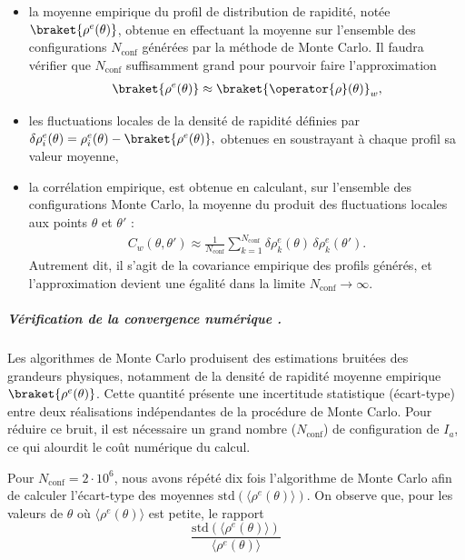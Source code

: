 \begin{itemize}[label = $\bullet$]
    \item la moyenne empirique du profil de distribution de rapidité, notée 
    \( \braket{\rho^e(\theta)}  \), obtenue en effectuant la moyenne sur l’ensemble des configurations \( N_{\text{conf}} \) générées par la méthode de Monte Carlo. Il faudra vérifier que \( N_{\text{conf}} \) suffisamment grand pour pourvoir faire l'approximation 
    \begin{eqnarray}\label{cahp4:eq.rho.e.1}
    	\braket{\rho^e(\theta)}  \approx \braket{\operator{\rho}(\theta)}_w,	
    \end{eqnarray}    
    \item les fluctuations locales de la densité de rapidité définies par 
    \(
    \delta\rho^e_i(\theta) = \rho^e_i(\theta) - \braket{\rho^e(\theta)},
    \)
    obtenues en soustrayant à chaque profil sa valeur moyenne,
    \item la corrélation empirique, est obtenue en calculant, sur l’ensemble des configurations Monte Carlo, la moyenne du produit des fluctuations locales aux points \(\theta\) et \(\theta'\) :
    \begin{eqnarray}\label{cahp4:eq.corre.e.1}
    	C_w(\theta, \theta') 
        \approx \frac{1}{N_{\text{conf}}} \sum_{k=1}^{N_{\text{conf}}} 
        \delta \rho^e_k(\theta) \, \delta \rho^e_k(\theta').	
    \end{eqnarray}
    Autrement dit, il s’agit de la covariance empirique des profils générés, et l’approximation devient une égalité dans la limite \( N_{\text{conf}} \to \infty \).
\end{itemize}

\medskip

\subparagraph{Vérification de la convergence numérique .}

Les algorithmes de Monte Carlo produisent des estimations bruitées des grandeurs physiques, notamment de la densité de rapidité moyenne empirique \( \braket{\rho^e(\theta)} \). Cette quantité présente une incertitude statistique (écart-type) entre deux réalisations indépendantes de la procédure de Monte Carlo. Pour réduire ce bruit, il est nécessaire un grand nombre ($N_{\text{conf}}$) de configuration de ${I_a}$, ce qui alourdit le coût numérique du calcul.

\smallskip

Pour \(N_{\text{conf}} = 2\cdot 10^6\), nous avons répété dix fois l’algorithme de Monte Carlo afin de calculer l’écart-type des moyennes \(\mathrm{std}(\langle \rho^e(\theta) \rangle)\). 
On observe que, pour les valeurs de \(\theta\) où \(\langle \rho^e(\theta) \rangle\) est petite, le rapport 
\begin{equation}\label{cha4:eq:std.1}
	\frac{\mathrm{std}(\langle \rho^e(\theta) \rangle)}{\langle \rho^e(\theta) \rangle}	
\end{equation}


